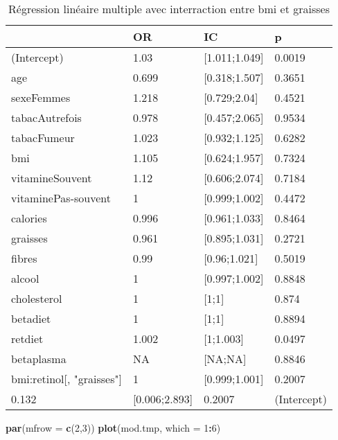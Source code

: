 \documentclass[]{article}
\newenvironment{Shaded}{\begin{snugshade}}{\end{snugshade}}
\newcommand{\KeywordTok}[1]{\textcolor[rgb]{0.13,0.29,0.53}{\textbf{#1}}}
\newcommand{\DataTypeTok}[1]{\textcolor[rgb]{0.13,0.29,0.53}{#1}}
\newcommand{\DecValTok}[1]{\textcolor[rgb]{0.00,0.00,0.81}{#1}}
\newcommand{\OperatorTok}[1]{\textcolor[rgb]{0.81,0.36,0.00}{\textbf{#1}}}
\newcommand{\NormalTok}[1]{#1}
\begin{document}
\begin{table}

\caption{\label{tab:unnamed-chunk-86}Régression linéaire multiple avec interraction entre bmi et graisses}
\centering
\begin{tabular}[t]{l|l|l|l}
\hline
  & OR & IC & p\\
\hline
\rowcolor[HTML]{BBD2E1}  (Intercept) & 1.03 & [1.011;1.049] & 0.0019\\
\hline
age & 0.699 & [0.318;1.507] & 0.3651\\
\hline
\rowcolor[HTML]{BBD2E1}  sexeFemmes & 1.218 & [0.729;2.04] & 0.4521\\
\hline
tabacAutrefois & 0.978 & [0.457;2.065] & 0.9534\\
\hline
\rowcolor[HTML]{BBD2E1}  tabacFumeur & 1.023 & [0.932;1.125] & 0.6282\\
\hline
bmi & 1.105 & [0.624;1.957] & 0.7324\\
\hline
\rowcolor[HTML]{BBD2E1}  vitamineSouvent & 1.12 & [0.606;2.074] & 0.7184\\
\hline
vitaminePas-souvent & 1 & [0.999;1.002] & 0.4472\\
\hline
\rowcolor[HTML]{BBD2E1}  calories & 0.996 & [0.961;1.033] & 0.8464\\
\hline
graisses & 0.961 & [0.895;1.031] & 0.2721\\
\hline
\rowcolor[HTML]{BBD2E1}  fibres & 0.99 & [0.96;1.021] & 0.5019\\
\hline
alcool & 1 & [0.997;1.002] & 0.8848\\
\hline
\rowcolor[HTML]{BBD2E1}  cholesterol & 1 & [1;1] & 0.874\\
\hline
betadiet & 1 & [1;1] & 0.8894\\
\hline
\rowcolor[HTML]{BBD2E1}  retdiet & 1.002 & [1;1.003] & 0.0497\\
\hline
betaplasma & NA & [NA;NA] & 0.8846\\
\hline
\rowcolor[HTML]{BBD2E1}  bmi:retinol[, "graisses"] & 1 & [0.999;1.001] & 0.2007\\
\hline
0.132 & [0.006;2.893] & 0.2007 & (Intercept)\\
\hline
\end{tabular}
\end{table}

\begin{Shaded}
\begin{Highlighting}[]
\KeywordTok{par}\NormalTok{(}\DataTypeTok{mfrow =} \KeywordTok{c}\NormalTok{(}\DecValTok{2}\NormalTok{,}\DecValTok{3}\NormalTok{))}
\KeywordTok{plot}\NormalTok{(mod.tmp, }\DataTypeTok{which =} \DecValTok{1}\OperatorTok{:}\DecValTok{6}\NormalTok{)}
\end{Highlighting}
\end{Shaded}
\end{document}
